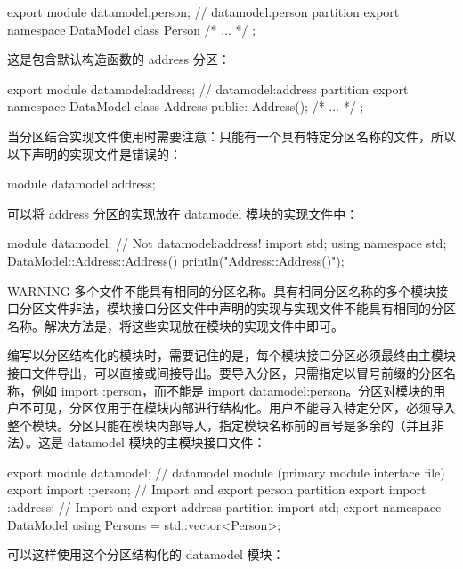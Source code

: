 \begin{cpp}
export module datamodel:person; // datamodel:person partition
export namespace DataModel { class Person { /* ... */ }; }
\end{cpp}

这是包含默认构造函数的 address 分区：

\begin{cpp}
export module datamodel:address; // datamodel:address partition
export namespace DataModel
{
    class Address
    {
        public:
        Address();
        /* ... */
    };
}
\end{cpp}

当分区结合实现文件使用时需要注意：只能有一个具有特定分区名称的文件，所以以下声明的实现文件是错误的：

\begin{cpp}
module datamodel:address;
\end{cpp}

可以将 address 分区的实现放在 datamodel 模块的实现文件中：

\begin{cpp}
module datamodel; // Not datamodel:address!
import std;
using namespace std;
DataModel::Address::Address() { println("Address::Address()"); }
\end{cpp}

\begin{myWarning}{WARNING}
多个文件不能具有相同的分区名称。具有相同分区名称的多个模块接口分区文件非法，模块接口分区文件中声明的实现与实现文件不能具有相同的分区名称。解决方法是，将这些实现放在模块的实现文件中即可。
\end{myWarning}

编写以分区结构化的模块时，需要记住的是，每个模块接口分区必须最终由主模块接口文件导出，可以直接或间接导出。要导入分区，只需指定以冒号前缀的分区名称，例如 import :person，而不能是 import datamodel:person。分区对模块的用户不可见，分区仅用于在模块内部进行结构化。用户不能导入特定分区，必须导入整个模块。分区只能在模块内部导入，指定模块名称前的冒号是多余的（并且非法）。这是 datamodel 模块的主模块接口文件：

\begin{cpp}
export module datamodel; // datamodel module (primary module interface file)
export import :person; // Import and export person partition
export import :address; // Import and export address partition
import std;
export namespace DataModel { using Persons = std::vector<Person>; }
\end{cpp}

可以这样使用这个分区结构化的 datamodel 模块：


